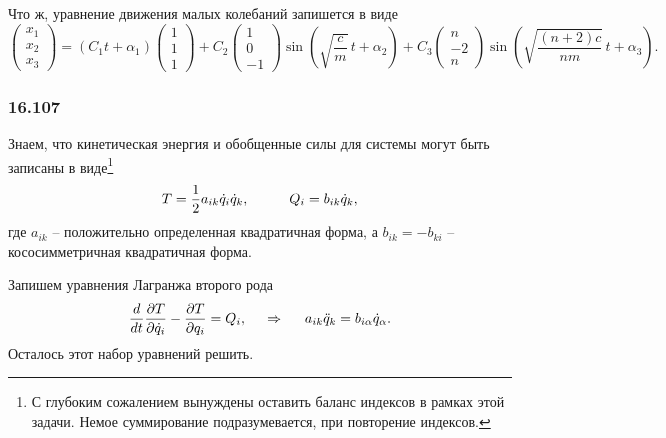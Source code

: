 Что ж, уравнение движения малых колебаний запишется в виде
\begin{equation*}
    \begin{pmatrix}
        x_1 \\ x_2 \\ x_3
    \end{pmatrix} = 
    (C_1 t + \alpha_1) \begin{pmatrix}
        1 \\ 1 \\ 1
    \end{pmatrix} + 
    C_2 \begin{pmatrix}
        1 \\ 0 \\ -1
    \end{pmatrix} 
    \sin \left(
        \sqrt{\frac{c}{m}} \, t + \alpha_2
    \right) + 
    C_3 \begin{pmatrix}
        n \\ -2 \\ n
    \end{pmatrix}
    \sin \left(
        \sqrt{\frac{(n+2)c}{nm}} \, t + \alpha_3
    \right).
\end{equation*}



\subsubsection*{16.107}


Знаем, что кинетическая энергия и обобщенные силы для системы могут быть записаны в виде\footnote{
    С глубоким сожалением вынуждены оставить баланс индексов в рамках этой задачи. Немое суммирование подразумевается, при повторение индексов.
} 
\begin{equation*}
    T = \frac{1}{2} a_{ik} \dot{q}_i \dot{q}_k,
    \hspace{1 cm}
    Q_i = b_{ik} \dot{q}_k,
\end{equation*}
где $a_{ik}$ -- положительно определенная квадратичная форма, а $b_{ik} = - b_{ki}$ -- кососимметричная квадратичная форма. 

Запишем уравнения Лагранжа второго рода
\begin{equation*}
    \frac{d }{d t} \frac{\partial T}{\partial \dot{q}_i} - \frac{\partial T}{\partial q_i} = Q_i,
    \hspace{0.5cm} \Rightarrow \hspace{0.5cm}
    a_{ik} \ddot{q}_k = b_{i\alpha} \dot{q}_\alpha.
\end{equation*}
Осталось этот набор уравнений решить.


